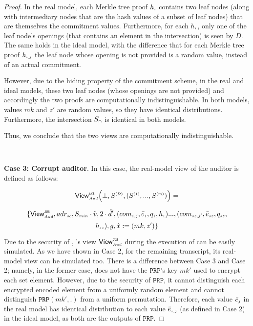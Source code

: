 \begin{proof}
 
 
 
 In the real model, each Merkle tree proof $h_{\scriptscriptstyle i}$ contains two leaf nodes (along with intermediary nodes that are the hash values of a subset of leaf nodes) that are themselves the commitment values. Furthermore, for each $h_{\scriptscriptstyle i}$, only one of the leaf node's openings (that contains an element in the intersection) is seen by $D$. The same holds in the ideal model, with the difference that for each Merkle tree proof $h_{\scriptscriptstyle i, j}$ the leaf node whose opening is not provided is a random value, instead of an actual commitment. 
 
 However, due to the hiding property of the commitment scheme, in the real and ideal models,  these two leaf nodes (whose openings are not provided) and accordingly the two proofs are computationally indistinguishable. In both models, values $mk$ and $z'$ are random values, so they have identical distributions. Furthermore, the intersection $S_{\scriptscriptstyle \cap}$ is identical in both models. 
 
 Thus, we conclude that the two views are computationally indistinguishable.
 
 
 \

\noindent\textbf{Case 3: Corrupt auditor}.  In this case, the real-model view of the auditor is defined as  follows: 

$$ \mathsf{View}_{\scriptscriptstyle Aud}^{\scriptscriptstyle \mathtt{ANE}} \Big(\bot, S^{\scriptscriptstyle (D)}, (S^{\scriptscriptstyle (1)},..., S^{\scriptscriptstyle (m)})\Big)=$$

$$ \{\mathsf{View}^{\scriptscriptstyle \mathtt{JUS}}_{\scriptscriptstyle Aud}, adr_{\scriptscriptstyle sc}, S_{\scriptscriptstyle min}\cdot \ddot{v}, 2\cdot \ddot{d}', (com_{\scriptscriptstyle 1,j}, \bar{e}_{\scriptscriptstyle 1}, q_{\scriptscriptstyle 1}, h_{\scriptscriptstyle 1})..., (com_{\scriptscriptstyle sz, j'}, \bar{e}_{\scriptscriptstyle sz}, q_{\scriptscriptstyle {sz}},$$ $$ h_{\scriptscriptstyle sz}), g, \hat{x}:=({mk}, z')\}$$


  Due to the security of \fpsi, \aud's view $\mathsf{View}^{\scriptscriptstyle \mathtt{JUS}}_{\scriptscriptstyle Aud}$ during the execution of \fpsi can be easily simulated. As we have shown in Case 2, for the remaining transcript, its real-model view can be simulated too. There is a difference between Case 3 and Case 2; namely, in the former case, \aud does not have the $\mathtt{PRP}$'s key $mk'$ used to encrypt each set element. However, due to the security of  $\mathtt{PRP}$, it cannot distinguish each encrypted encoded element from a uniformly random element and cannot distinguish $\mathtt{PRP}(mk',.)$ from a uniform permutation. Therefore, each value $\bar{e}_{\scriptscriptstyle j}$ in the real model has identical distribution to each value $\bar{e}_{\scriptscriptstyle i,j}$ (as defined in Case 2) in the ideal model, as both are the outputs of $\mathtt{PRP}$. 


\end{proof}
